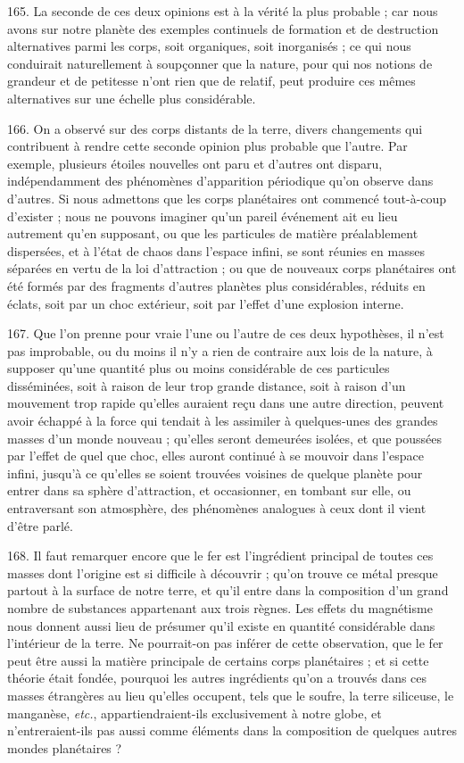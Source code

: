 \documentclass[a4paper, 11pt, oneside, polutonikogreek, french]{article}
\begin{document}
165. La seconde de ces deux opinions est à la vérité la plus probable ; car nous avons sur notre planète des exemples continuels de formation et de destruction alternatives parmi les corps, soit organiques, soit inorganisés ; ce qui nous conduirait naturellement à soupçonner que la nature, pour qui nos notions de grandeur et de petitesse n'ont rien que de relatif, peut produire ces mêmes alternatives sur une échelle plus considérable.

166. On a observé sur des corps distants de la terre, divers changements qui contribuent à rendre cette seconde opinion plus probable que l'autre. Par exemple, plusieurs étoiles nouvelles ont paru et d'autres ont disparu, indépendamment des phénomènes d'apparition périodique qu'on observe dans d'autres. Si nous admettons que les corps planétaires ont commencé tout-à-coup d'exister ; nous ne pouvons imaginer qu'un pareil événement ait eu lieu autrement qu'en supposant, ou que les particules de matière préalablement dispersées, et à l'état de chaos dans l'espace infini, se sont réunies en masses séparées en vertu de la loi d'attraction ; ou que de nouveaux corps planétaires ont été formés par des fragments d'autres planètes plus considérables, réduits en éclats, soit par un choc extérieur, soit par l'effet d'une explosion interne.

167. Que l'on prenne pour vraie l'une ou l'autre de ces deux hypothèses, il n'est pas improbable, ou du moins il n'y a rien de contraire aux lois de la nature, à supposer qu'une quantité plus ou moins considérable de ces particules disséminées, soit à raison de leur trop grande distance, soit à raison d'un mouvement trop rapide qu'elles auraient reçu dans une autre direction, peuvent avoir échappé à la force qui tendait à les assimiler à quelques-unes des grandes masses d'un monde nouveau ; qu'elles seront demeurées isolées, et que poussées par l'effet de quel que choc, elles auront continué à se mouvoir dans l'espace infini, jusqu'à ce qu'elles se soient trouvées voisines de quelque planète pour entrer dans sa sphère d'attraction, et occasionner, en tombant sur elle, ou entraversant son atmosphère, des phénomènes analogues à ceux dont il vient d'être parlé.

168. Il faut remarquer encore que le fer est l'ingrédient principal de toutes ces masses dont l'origine est si difficile à découvrir ; qu'on trouve ce métal presque partout à la surface de notre terre, et qu'il entre dans la composition d'un grand nombre de substances appartenant aux trois règnes. Les effets du magnétisme nous donnent aussi lieu de présumer qu'il existe en quantité considérable dans l'intérieur de la terre. Ne pourrait-on pas inférer de cette observation, que le fer peut être aussi la matière principale de certains corps planétaires ; et si cette théorie était fondée, pourquoi les autres ingrédients qu'on a trouvés dans ces masses étrangères au lieu qu'elles occupent, tels que le soufre, la terre siliceuse, le manganèse, \emph{etc.}, appartiendraient-ils exclusivement à notre globe, et n'entreraient-ils pas aussi comme éléments dans la composition de quelques autres mondes planétaires ? \fg
\end{document}
